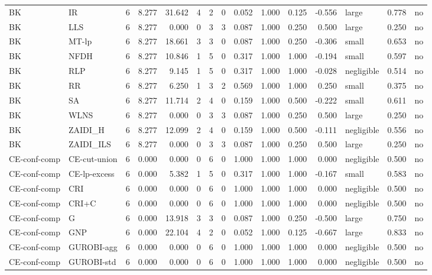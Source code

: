 \begin{table}[htbp]
\begin{tabular}{llrrrrrrrrrrlrr}
BK & IR & 6 & 8.277 & 31.642 & 4 & 2 & 0 & 0.052 & 1.000 & 0.125 & -0.556 & large & 0.778 & no \\
BK & LLS & 6 & 8.277 & 0.000 & 0 & 3 & 3 & 0.087 & 1.000 & 0.250 & 0.500 & large & 0.250 & no \\
BK & MT-lp & 6 & 8.277 & 18.661 & 3 & 3 & 0 & 0.087 & 1.000 & 0.250 & -0.306 & small & 0.653 & no \\
BK & NFDH & 6 & 8.277 & 10.846 & 1 & 5 & 0 & 0.317 & 1.000 & 1.000 & -0.194 & small & 0.597 & no \\
BK & RLP & 6 & 8.277 & 9.145 & 1 & 5 & 0 & 0.317 & 1.000 & 1.000 & -0.028 & negligible & 0.514 & no \\
BK & RR & 6 & 8.277 & 6.250 & 1 & 3 & 2 & 0.569 & 1.000 & 1.000 & 0.250 & small & 0.375 & no \\
BK & SA & 6 & 8.277 & 11.714 & 2 & 4 & 0 & 0.159 & 1.000 & 0.500 & -0.222 & small & 0.611 & no \\
BK & WLNS & 6 & 8.277 & 0.000 & 0 & 3 & 3 & 0.087 & 1.000 & 0.250 & 0.500 & large & 0.250 & no \\
BK & ZAIDI\_H & 6 & 8.277 & 12.099 & 2 & 4 & 0 & 0.159 & 1.000 & 0.500 & -0.111 & negligible & 0.556 & no \\
BK & ZAIDI\_ILS & 6 & 8.277 & 0.000 & 0 & 3 & 3 & 0.087 & 1.000 & 0.250 & 0.500 & large & 0.250 & no \\
CE-conf-comp & CE-cut-union & 6 & 0.000 & 0.000 & 0 & 6 & 0 & 1.000 & 1.000 & 1.000 & 0.000 & negligible & 0.500 & no \\
CE-conf-comp & CE-lp-excess & 6 & 0.000 & 5.382 & 1 & 5 & 0 & 0.317 & 1.000 & 1.000 & -0.167 & small & 0.583 & no \\
CE-conf-comp & CRI & 6 & 0.000 & 0.000 & 0 & 6 & 0 & 1.000 & 1.000 & 1.000 & 0.000 & negligible & 0.500 & no \\
CE-conf-comp & CRI+C & 6 & 0.000 & 0.000 & 0 & 6 & 0 & 1.000 & 1.000 & 1.000 & 0.000 & negligible & 0.500 & no \\
CE-conf-comp & G & 6 & 0.000 & 13.918 & 3 & 3 & 0 & 0.087 & 1.000 & 0.250 & -0.500 & large & 0.750 & no \\
CE-conf-comp & GNP & 6 & 0.000 & 22.104 & 4 & 2 & 0 & 0.052 & 1.000 & 0.125 & -0.667 & large & 0.833 & no \\
CE-conf-comp & GUROBI-agg & 6 & 0.000 & 0.000 & 0 & 6 & 0 & 1.000 & 1.000 & 1.000 & 0.000 & negligible & 0.500 & no \\
CE-conf-comp & GUROBI-std & 6 & 0.000 & 0.000 & 0 & 6 & 0 & 1.000 & 1.000 & 1.000 & 0.000 & negligible & 0.500 & no \\

\end{tabular}
\end{table}
